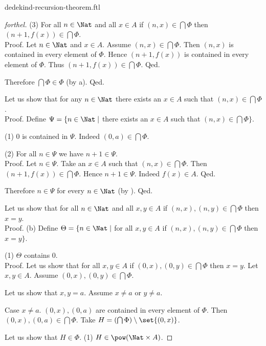\documentclass{naproche-library}
\begin{document}
\begin{smodule}{dedekind-recursion-theorem.ftl}
\begin{proof}[forthel]
      (3) For all $n \in \Nat$ and all $x \in A$ if $(n, x) \in
      \bigcap \Phi$ then $(n + 1, f(x)) \in \bigcap \Phi$. \\
      Proof.
        Let $n \in \Nat$ and $x \in A$.
        Assume $(n, x) \in \bigcap \Phi$.
        Then $(n, x)$ is contained in every element of $\Phi$.
        Hence $(n + 1, f(x))$ is contained in every element of $\Phi$.
        Thus $(n + 1, f(x)) \in \bigcap \Phi$.
      Qed.

      Therefore $\bigcap \Phi \in \Phi$ (by a).
    Qed.

    Let us show that for any $n \in \Nat$ there exists an $x \in A$ such
    that $(n, x) \in \bigcap \Phi$. \\
    Proof.
      Define $\Psi = \{ n \in \Nat \mid$ there exists an $x \in A$ such that
      $(n, x) \in \bigcap \Phi \}$.

      (1) $0$ is contained in $\Psi$.
      Indeed $(0, a) \in \bigcap \Phi$.

      (2) For all $n \in \Psi$ we have $n + 1 \in \Psi$. \\
      Proof.
        Let $n \in \Psi$.
        Take an $x \in A$ such that $(n, x) \in \bigcap \Phi$.
        Then $(n + 1, f(x)) \in \bigcap \Phi$.
        Hence $n + 1 \in \Psi$.
        Indeed $f(x) \in A$.
      Qed.

      Therefore $n \in \Psi$ for every $n \in \Nat$ (by ).
    Qed.

    Let us show that for all $n \in \Nat$ and all $x, y \in A$ if
    $(n, x), (n, y) \in \bigcap \Phi$ then $x = y$. \\
    Proof.
      (b) Define $\Theta = \{ n \in \Nat \mid$ for all $x, y \in A$ if
      $(n, x), (n, y) \in \bigcap \Phi$ then $x = y \}$.

      (1) $\Theta$ contains $0$. \\
      Proof.
        Let us show that for all $x, y \in A$ if $(0, x), (0, y) \in
        \bigcap \Phi$ then $x = y$.
          Let $x, y \in A$.
          Assume $(0, x), (0, y) \in \bigcap \Phi$.

          Let us show that $x, y = a$.
            Assume $x \neq a$ or $y \neq a$.

            Case $x \neq a$.
              $(0,x), (0,a)$ are contained in every element of $\Phi$.
              Then $(0,x), (0,a) \in \bigcap \Phi$.
              Take $H = (\bigcap \Phi) \setminus \set{(0,x)}$.

              Let us show that $H \in \Phi$.
                (1) $H \in \pow(\Nat \times A)$.


\end{proof}
\end{smodule}
\end{document}

